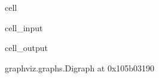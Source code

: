 \documentclass[letterpaper,10pt,english]{jupyterBook}
\begin{document}
\begin{sphinxuseclass}{cell}
\begin{sphinxVerbatimInput}
\begin{sphinxuseclass}{cell_input}
\end{sphinxuseclass}\end{sphinxVerbatimInput}
\begin{sphinxVerbatimOutput}

\begin{sphinxuseclass}{cell_output}
\begin{sphinxVerbatim}[commandchars=\\\{\}]
\PYGZlt{}graphviz.graphs.Digraph at 0x105b03190\PYGZgt{}
\end{sphinxVerbatim}

\end{sphinxuseclass}\end{sphinxVerbatimOutput}

\end{sphinxuseclass}
\sphinxAtStartPar
{}
\end{document}
